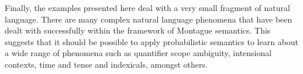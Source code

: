 \documentclass[11pt]{article}
\theoremstyle{definition}
\begin{document}
Finally, the examples presented here deal with a very small fragment
of natural language. There are many complex natural language phenomena
that have been dealt with successfully within the framework of
Montague semantics. This suggests that it should be possible to apply
probabilistic semantics to learn about a wide range of phenomena such
as quantifier scope ambiguity, intensional contexts, time and tense
and indexicals, amongst others.





\end{document}
